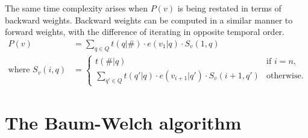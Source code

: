 The same time complexity arises when $P(v)$ is being restated in terms of
backward weights. Backward weights can be computed in a similar manner to
forward weights, with the difference of iterating in opposite temporal order.
\begin{align*}
 P(v) &= \sum_{q\in Q} t(q|\#) \cdot e(v_1|q) \cdot S_v(1,q) \\
 \text{where } S_v(i,q) &= \begin{cases}
  t(\#|q) & \text{if }i=n, \\
  \sum_{q'\in Q} t(q'|q) \cdot e(v_{i+1}|q') \cdot S_v(i+1,q') & \text{otherwise}.
 \end{cases}
\end{align*}

\section{The Baum-Welch algorithm}

